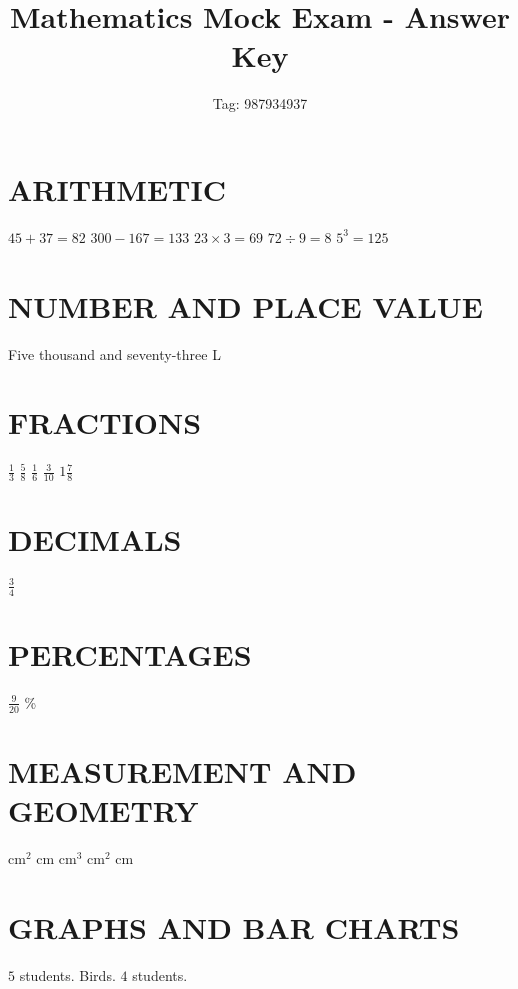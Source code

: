\documentclass{exam}
\begin{document}
\title{Mathematics Mock Exam - Answer Key}
\date{Tag: 987934937}
\maketitle

\section{ARITHMETIC}
\begin{questions}
\question $45 + 37 = 82$
\question $300 - 167 = 133$
\question $23 \times 3 = 69$
\question $72 \div 9 = 8$
\question $5^3 = 125$
\end{questions}

\section{NUMBER AND PLACE VALUE}
\begin{questions}
\question Five thousand and seventy-three
\question L
\end{questions}

\section{FRACTIONS}
\begin{questions}
\question $\frac{1}{3}$
\question $\frac{5}{8}$
\question $\frac{1}{6}$
\question $\frac{3}{10}$
\question $1\frac{7}{8}$
\end{questions}

\section{DECIMALS}
\begin{questions}
\question $\frac{3}{4}$
\end{questions}

\section{PERCENTAGES}
\begin{questions}
\question $\frac{9}{20}$
\%
\end{questions}

\section{MEASUREMENT AND GEOMETRY}
\begin{questions}
 cm$^2$
 cm
 cm$^3$
 cm$^2$
 cm
\end{questions}

\section{GRAPHS AND BAR CHARTS}
\begin{questions}
\question $5$ students.
\question Birds.
\question $4$ students.
\end{questions}
\end{document}
